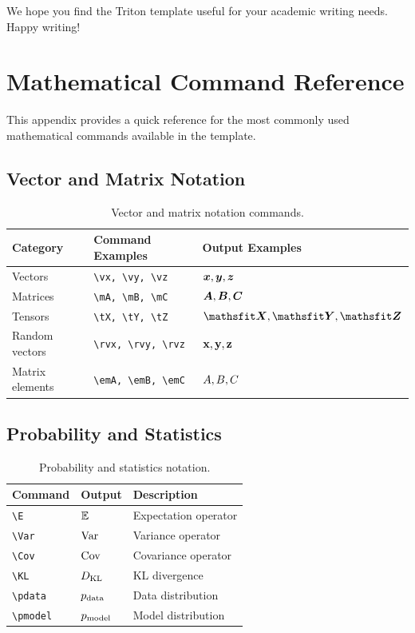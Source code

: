 \documentclass{triton}
\begin{document}
We hope you find the Triton template useful for your academic writing needs. Happy writing!

\newpage



\newpage
\beginappendix

\section{Mathematical Command Reference}
\label{sec:math}

This appendix provides a quick reference for the most commonly used mathematical commands available in the template.

\subsection{Vector and Matrix Notation}

\begin{table}[h]
\centering
\small
\begin{tabular}{@{}lll@{}}
\toprule
\textbf{Category} & \textbf{Command Examples} & \textbf{Output Examples} \\
\midrule
Vectors & \verb|\vx, \vy, \vz| & ${\bm{x}}, {\bm{y}}, {\bm{z}}$ \\
Matrices & \verb|\mA, \mB, \mC| & ${\bm{A}}, {\bm{B}}, {\bm{C}}$ \\
Tensors & \verb|\tX, \tY, \tZ| & $\tX, \tY, \tZ$ \\
Random vectors & \verb|\rvx, \rvy, \rvz| & ${\mathbf{x}}, {\mathbf{y}}, {\mathbf{z}}$ \\
Matrix elements & \verb|\emA, \emB, \emC| & ${A}, {B}, {C}$ \\
\bottomrule
\end{tabular}
\caption{Vector and matrix notation commands.}
\end{table}

\subsection{Probability and Statistics}

\begin{table}[h]
\centering
\small
\begin{tabular}{@{}lll@{}}
\toprule
\textbf{Command} & \textbf{Output} & \textbf{Description} \\
\midrule
\verb|\E| & $\mathbb{E}$ & Expectation operator \\
\verb|\Var| & $\mathrm{Var}$ & Variance operator \\
\verb|\Cov| & $\mathrm{Cov}$ & Covariance operator \\
\verb|\KL| & $D_{\mathrm{KL}}$ & KL divergence \\
\verb|\pdata| & $p_{\rm{data}}$ & Data distribution \\
\verb|\pmodel| & $p_{\rm{model}}$ & Model distribution \\
\bottomrule
\end{tabular}
\caption{Probability and statistics notation.}
\end{table}
\end{document}
